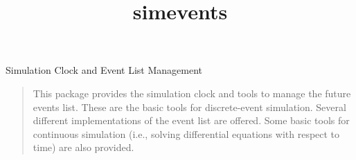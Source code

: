 \begin{titlepage}

\iffalse %

Other potential names:
  
  Simja,  Simjava,  Javasim,  Javarand,  Javaran,  Javas 
  flexim, simflex, SIM-J

 {\sc Pierre L'Ecuyer}  %
\footnote {\normalsize 
  Most of the implementation of SSJ was done by Lakhdar Meliani   
  for his master's thesis.} \\
\medskip
  D\'epartement d'Informatique et de Recherche Op\'erationnelle \\
  Universit\'e de Montr\'eal \
\vfill\vfill
\end {center}

\fi  %

\title{simevents}{Simulation Clock and Event List Management}

\begin {quote}
This package provides the simulation clock and tools to manage the
future events list.  These are the basic tools for discrete-event
simulation.  Several different implementations of the event list are
offered.  Some basic tools for continuous simulation (i.e., solving
differential equations with respect to time) are also provided.
\end {quote}

\begin {comment}
SSJ (an acronym for {\em Stochastic Simulation in Java\/}) is 
a library of classes, implemented in the Java programming language,
offering general-purpose facilities for simulation programming.
It supports the event view, process view, continuous simulation,
and arbitrary mixtures of these.
\end {comment}

\vfill\vfill

\end{titlepage}
